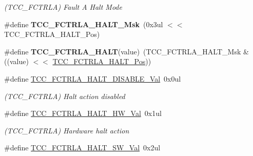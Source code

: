 \begin{DoxyCompactItemize}
\begin{DoxyCompactList}\small\item\em (T\+C\+C\+\_\+\+F\+C\+T\+R\+L\+A) Fault A Halt Mode \end{DoxyCompactList}\item 
\hypertarget{group___s_a_m_l21___t_c_c_ga7fed4c4d077ab5a22fa19eea55462b3f}{}\#define {\bfseries T\+C\+C\+\_\+\+F\+C\+T\+R\+L\+A\+\_\+\+H\+A\+L\+T\+\_\+\+Msk}~(0x3ul $<$$<$ T\+C\+C\+\_\+\+F\+C\+T\+R\+L\+A\+\_\+\+H\+A\+L\+T\+\_\+\+Pos)\label{group___s_a_m_l21___t_c_c_ga7fed4c4d077ab5a22fa19eea55462b3f}

\item 
\hypertarget{group___s_a_m_l21___t_c_c_ga15fc07b31413745f4aae121f9affa846}{}\#define {\bfseries T\+C\+C\+\_\+\+F\+C\+T\+R\+L\+A\+\_\+\+H\+A\+L\+T}(value)~(T\+C\+C\+\_\+\+F\+C\+T\+R\+L\+A\+\_\+\+H\+A\+L\+T\+\_\+\+Msk \& ((value) $<$$<$ \hyperlink{group___s_a_m_l21___t_c_c_ga8057b61f673517b6a99ea43d1942b094}{T\+C\+C\+\_\+\+F\+C\+T\+R\+L\+A\+\_\+\+H\+A\+L\+T\+\_\+\+Pos}))\label{group___s_a_m_l21___t_c_c_ga15fc07b31413745f4aae121f9affa846}

\item 
\hypertarget{group___s_a_m_l21___t_c_c_gac436323e2dbed407d23750b4aa200090}{}\#define \hyperlink{group___s_a_m_l21___t_c_c_gac436323e2dbed407d23750b4aa200090}{T\+C\+C\+\_\+\+F\+C\+T\+R\+L\+A\+\_\+\+H\+A\+L\+T\+\_\+\+D\+I\+S\+A\+B\+L\+E\+\_\+\+Val}~0x0ul\label{group___s_a_m_l21___t_c_c_gac436323e2dbed407d23750b4aa200090}

\begin{DoxyCompactList}\small\item\em (T\+C\+C\+\_\+\+F\+C\+T\+R\+L\+A) Halt action disabled \end{DoxyCompactList}\item 
\hypertarget{group___s_a_m_l21___t_c_c_ga4b0ed21a650bc49adc693fc7f32862c4}{}\#define \hyperlink{group___s_a_m_l21___t_c_c_ga4b0ed21a650bc49adc693fc7f32862c4}{T\+C\+C\+\_\+\+F\+C\+T\+R\+L\+A\+\_\+\+H\+A\+L\+T\+\_\+\+H\+W\+\_\+\+Val}~0x1ul\label{group___s_a_m_l21___t_c_c_ga4b0ed21a650bc49adc693fc7f32862c4}

\begin{DoxyCompactList}\small\item\em (T\+C\+C\+\_\+\+F\+C\+T\+R\+L\+A) Hardware halt action \end{DoxyCompactList}\item 
\hypertarget{group___s_a_m_l21___t_c_c_ga0563bbeed823f848ce15d69fd7de2d3f}{}\#define \hyperlink{group___s_a_m_l21___t_c_c_ga0563bbeed823f848ce15d69fd7de2d3f}{T\+C\+C\+\_\+\+F\+C\+T\+R\+L\+A\+\_\+\+H\+A\+L\+T\+\_\+\+S\+W\+\_\+\+Val}~0x2ul\label{group___s_a_m_l21___t_c_c_ga0563bbeed823f848ce15d69fd7de2d3f}


\end{DoxyCompactItemize}
